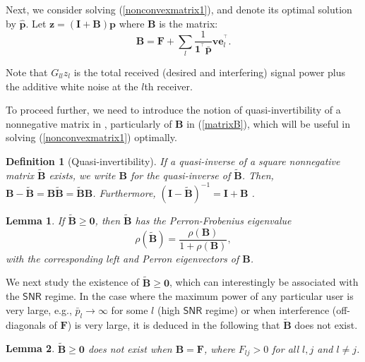 \documentclass[10pt,twocolumn]{IEEEtran}
\newcommand{\0}{\mathbf{0}}
\newcommand{\1}{\mathbf{1}}
\newcommand{\trans}{^\top}
\newtheorem{definition}{Definition}
\newtheorem{lemma}{Lemma}
\begin{document}
Next, we consider solving (\ref{nonconvexmatrix1}), and denote its optimal solution by $\mathbf{\widehat{p}}$. Let $\mathbf{z}=\left(\mathbf{I}+\mathbf{B}\right)\mathbf{p}$ where $\mathbf{B}$ is the matrix:
\begin{equation}
\label{matrixB}
\mathbf{B} = \mathbf{F} + \sum_l \frac{1}{\mathbf{1}^{\trans} \mathbf{\bar{p}}} \mathbf{v} \mathbf{e}_l^{\trans}.
\end{equation}

Note that $G_{ll}z_l$ is the total received (desired and interfering) signal power plus the additive white noise at the $l$th receiver.

To proceed further, we need to introduce the notion of quasi-invertibility of a nonnegative matrix in \cite{Wong54}, particularly of $\mathbf{B}$ in (\ref{matrixB}), which will be useful in solving (\ref{nonconvexmatrix1}) optimally.
\begin{definition}[Quasi-invertibility]
\label{qidef}
If a quasi-inverse of a square nonnegative matrix $\mathbf{\tilde{B}}$ exists, we write $\mathbf{B}$ for the quasi-inverse of $\mathbf{\tilde{B}}$. Then, $\mathbf{B}-\mathbf{\tilde{B}} = \mathbf{B} \mathbf{\tilde{B}} = \mathbf{\tilde{B}} \mathbf{B}$. Furthermore, $(\mathbf{I} - \mathbf{\tilde{B}})^{-1} = \mathbf{I} + \mathbf{B}$ \cite{Wong54}.
\end{definition}

\begin{lemma}
\label{lemmarhoB}
If $\mathbf{\tilde{B}} \ge \mathbf{0}$, then $\mathbf{\tilde{B}}$ has the Perron-Frobenius eigenvalue
\begin{equation}
\label{rhotildeBeqn}
\rho(\mathbf{\tilde{B}}) = \frac{\rho(\mathbf{B})}{1+\rho(\mathbf{B})},
\end{equation}
with the corresponding left and Perron eigenvectors of $\mathbf{B}$.
\end{lemma}

We next study the existence of $\mathbf{\tilde{B}} \ge \mathbf{0}$, which can interestingly be associated with the $\mathsf{SNR}$ regime. In the case where the maximum power of any particular user is very large, e.g., $\bar{p}_l \rightarrow \infty$ for some $l$ (high $\mathsf{SNR}$ regime) or when interference (off-diagonals of $\mathbf{F}$) is very large, it is deduced in the following that $\mathbf{\tilde{B}}$ does not exist.
\begin{lemma}
\label{bhasnotildeb}
$\mathbf{\tilde{B}} \ge \mathbf{0}$ does not exist when $\mathbf{B} = \mathbf{F}$, where $F_{lj}>0$ for all $l,j$ and $l \ne j$.
\end{lemma}
\end{document}
